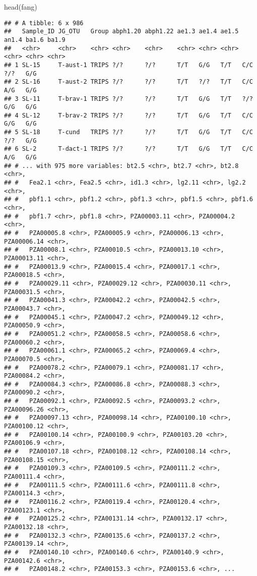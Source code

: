 \documentclass[
]{article}
\newenvironment{Shaded}{\begin{snugshade}}{\end{snugshade}}
\newcommand{\FunctionTok}[1]{\textcolor[rgb]{0.00,0.00,0.00}{#1}}
\newcommand{\NormalTok}[1]{#1}
\begin{document}
\begin{Shaded}
\begin{Highlighting}[]
\FunctionTok{head}\NormalTok{(fang)}
\end{Highlighting}
\end{Shaded}

\begin{verbatim}
## # A tibble: 6 x 986
##   Sample_ID JG_OTU   Group abph1.20 abph1.22 ae1.3 ae1.4 ae1.5 an1.4 ba1.6 ba1.9
##   <chr>     <chr>    <chr> <chr>    <chr>    <chr> <chr> <chr> <chr> <chr> <chr>
## 1 SL-15     T-aust-1 TRIPS ?/?      ?/?      T/T   G/G   T/T   C/C   ?/?   G/G  
## 2 SL-16     T-aust-2 TRIPS ?/?      ?/?      T/T   ?/?   T/T   C/C   A/G   G/G  
## 3 SL-11     T-brav-1 TRIPS ?/?      ?/?      T/T   G/G   T/T   ?/?   G/G   G/G  
## 4 SL-12     T-brav-2 TRIPS ?/?      ?/?      T/T   G/G   T/T   C/C   G/G   G/G  
## 5 SL-18     T-cund   TRIPS ?/?      ?/?      T/T   G/G   T/T   C/C   ?/?   G/G  
## 6 SL-2      T-dact-1 TRIPS ?/?      ?/?      T/T   G/G   T/T   C/C   A/G   G/G  
## # ... with 975 more variables: bt2.5 <chr>, bt2.7 <chr>, bt2.8 <chr>,
## #   Fea2.1 <chr>, Fea2.5 <chr>, id1.3 <chr>, lg2.11 <chr>, lg2.2 <chr>,
## #   pbf1.1 <chr>, pbf1.2 <chr>, pbf1.3 <chr>, pbf1.5 <chr>, pbf1.6 <chr>,
## #   pbf1.7 <chr>, pbf1.8 <chr>, PZA00003.11 <chr>, PZA00004.2 <chr>,
## #   PZA00005.8 <chr>, PZA00005.9 <chr>, PZA00006.13 <chr>, PZA00006.14 <chr>,
## #   PZA00008.1 <chr>, PZA00010.5 <chr>, PZA00013.10 <chr>, PZA00013.11 <chr>,
## #   PZA00013.9 <chr>, PZA00015.4 <chr>, PZA00017.1 <chr>, PZA00018.5 <chr>,
## #   PZA00029.11 <chr>, PZA00029.12 <chr>, PZA00030.11 <chr>, PZA00031.5 <chr>,
## #   PZA00041.3 <chr>, PZA00042.2 <chr>, PZA00042.5 <chr>, PZA00043.7 <chr>,
## #   PZA00045.1 <chr>, PZA00047.2 <chr>, PZA00049.12 <chr>, PZA00050.9 <chr>,
## #   PZA00051.2 <chr>, PZA00058.5 <chr>, PZA00058.6 <chr>, PZA00060.2 <chr>,
## #   PZA00061.1 <chr>, PZA00065.2 <chr>, PZA00069.4 <chr>, PZA00070.5 <chr>,
## #   PZA00078.2 <chr>, PZA00079.1 <chr>, PZA00081.17 <chr>, PZA00084.2 <chr>,
## #   PZA00084.3 <chr>, PZA00086.8 <chr>, PZA00088.3 <chr>, PZA00090.2 <chr>,
## #   PZA00092.1 <chr>, PZA00092.5 <chr>, PZA00093.2 <chr>, PZA00096.26 <chr>,
## #   PZA00097.13 <chr>, PZA00098.14 <chr>, PZA00100.10 <chr>, PZA00100.12 <chr>,
## #   PZA00100.14 <chr>, PZA00100.9 <chr>, PZA00103.20 <chr>, PZA00106.9 <chr>,
## #   PZA00107.18 <chr>, PZA00108.12 <chr>, PZA00108.14 <chr>, PZA00108.15 <chr>,
## #   PZA00109.3 <chr>, PZA00109.5 <chr>, PZA00111.2 <chr>, PZA00111.4 <chr>,
## #   PZA00111.5 <chr>, PZA00111.6 <chr>, PZA00111.8 <chr>, PZA00114.3 <chr>,
## #   PZA00116.2 <chr>, PZA00119.4 <chr>, PZA00120.4 <chr>, PZA00123.1 <chr>,
## #   PZA00125.2 <chr>, PZA00131.14 <chr>, PZA00132.17 <chr>, PZA00132.18 <chr>,
## #   PZA00132.3 <chr>, PZA00135.6 <chr>, PZA00137.2 <chr>, PZA00139.14 <chr>,
## #   PZA00140.10 <chr>, PZA00140.6 <chr>, PZA00140.9 <chr>, PZA00142.6 <chr>,
## #   PZA00148.2 <chr>, PZA00153.3 <chr>, PZA00153.6 <chr>, ...
\end{verbatim}
\end{document}
